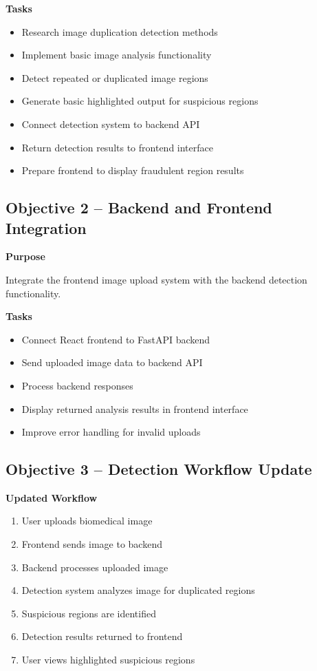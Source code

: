 \documentclass[12pt]{article}
\begin{document}
\textbf{Tasks}

\begin{itemize}
    \item Research image duplication detection methods
    \item Implement basic image analysis functionality
    \item Detect repeated or duplicated image regions
    \item Generate basic highlighted output for suspicious regions
    \item Connect detection system to backend API
    \item Return detection results to frontend interface
    \item Prepare frontend to display fraudulent region results
\end{itemize}

\subsection{Objective 2 -- Backend and Frontend Integration}

\textbf{Purpose}

Integrate the frontend image upload system with the backend detection functionality.

\textbf{Tasks}

\begin{itemize}
    \item Connect React frontend to FastAPI backend
    \item Send uploaded image data to backend API
    \item Process backend responses
    \item Display returned analysis results in frontend interface
    \item Improve error handling for invalid uploads
\end{itemize}

\subsection{Objective 3 -- Detection Workflow Update}

\textbf{Updated Workflow}

\begin{enumerate}
    \item User uploads biomedical image
    \item Frontend sends image to backend
    \item Backend processes uploaded image
    \item Detection system analyzes image for duplicated regions
    \item Suspicious regions are identified
    \item Detection results returned to frontend
    \item User views highlighted suspicious regions
\end{enumerate}
\end{document}
